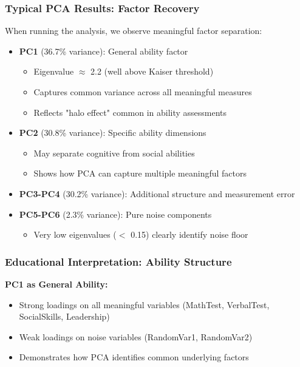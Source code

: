 \documentclass[aspectratio=169]{beamer}
\begin{document}
\begin{frame}
    \frametitle{Typical PCA Results: Factor Recovery}
    When running the analysis, we observe meaningful factor separation:
    \begin{itemize}
        \item \textbf{PC1} (36.7\% variance): General ability factor \pause
              \begin{itemize}
                  \item Eigenvalue $\approx$ 2.2 (well above Kaiser threshold) \pause
                  \item Captures common variance across all meaningful measures \pause
                  \item Reflects "halo effect" common in ability assessments \pause
              \end{itemize}
        \item \textbf{PC2} (30.8\% variance): Specific ability dimensions \pause
              \begin{itemize}
                  \item May separate cognitive from social abilities \pause
                  \item Shows how PCA can capture multiple meaningful factors \pause
              \end{itemize}
        \item \textbf{PC3-PC4} (30.2\% variance): Additional structure and measurement error \pause
        \item \textbf{PC5-PC6} (2.3\% variance): Pure noise components \pause
              \begin{itemize}
                  \item Very low eigenvalues ($<$ 0.15) clearly identify noise floor \pause
              \end{itemize}
    \end{itemize}
\end{frame}

\begin{frame}
    \frametitle{Educational Interpretation: Ability Structure}
    \textbf{PC1 as General Ability:}
    \begin{itemize}
        \item Strong loadings on all meaningful variables (MathTest, VerbalTest, SocialSkills, Leadership) \pause
        \item Weak loadings on noise variables (RandomVar1, RandomVar2) \pause
        \item Demonstrates how PCA identifies common underlying factors \pause
    \end{itemize}
\end{frame}
\end{document}
